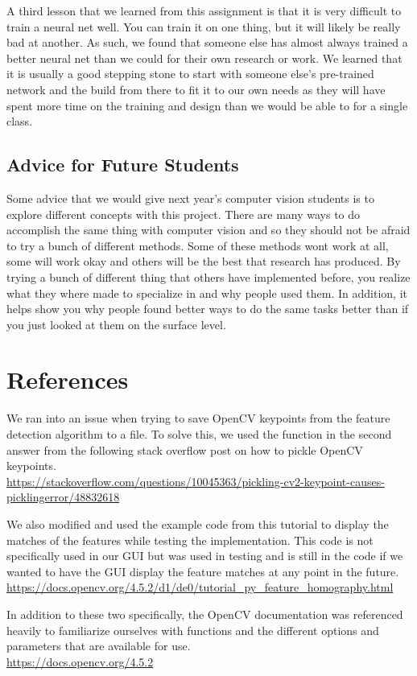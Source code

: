\documentclass[12pt]{article}
\begin{document}
	A third lesson that we learned from this assignment is that it is very difficult to train a neural net well. You can train it on one thing, but it will likely be really bad at another. As such, we found that someone else has almost always trained a better neural net than we could for their own research or work. We learned that it is usually a good stepping stone to start with someone else's pre-trained network and the build from there to fit it to our own needs as they will have spent more time on the training and design than we would be able to for a single class.

\subsection{Advice for Future Students}
	Some advice that we would give next year's computer vision students is to explore different concepts with this project. There are many ways to do accomplish the same thing with computer vision and so they should not be afraid to try a bunch of different methods. Some of these methods wont work at all, some will work okay and others will be the best that research has produced. By trying a bunch of different thing that others have implemented before, you realize what they where made to specialize in and why people used them. In addition, it helps show you why people found better ways to do the same tasks better than if you just looked at them on the surface level.


\section*{References}

	We ran into an issue when trying to save OpenCV keypoints from the feature detection algorithm to a file. To solve this, we used the function in the second answer from the following stack overflow post on how to pickle OpenCV keypoints. \\
	\url{https://stackoverflow.com/questions/10045363/pickling-cv2-keypoint-causes-picklingerror/48832618}
	
	
	We also modified and used the example code from this tutorial to display the matches of the features while testing the implementation. This code is not specifically used in our GUI but was used in testing and is still in the code if we wanted to have the GUI display the feature matches at any point in the future. \\
	\url{https://docs.opencv.org/4.5.2/d1/de0/tutorial_py_feature_homography.html}
	
	In addition to these two specifically, the OpenCV documentation was referenced heavily to familiarize ourselves with functions and the different options and parameters that are available for use. \\
	\url{https://docs.opencv.org/4.5.2}
\end{document}
